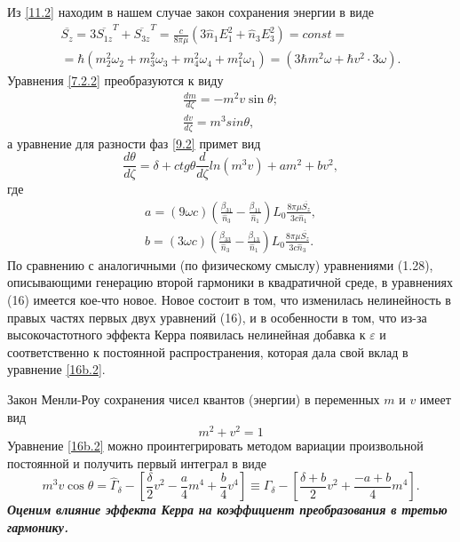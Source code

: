 \documentclass[a4paper]{article}
\begin{document}
	Из \eqref{11.2} находим в нашем случае закон сохранения энергии в виде 
	\begin{multline}
		\overline{S_{z}}=3\overline{S_{1z}}^{T}+\overline{S_{3z}}^{T}=\frac{c}{8\pi\mu}\left(3\hat{n}_{1}E_{1}^{2}+\hat{n}_{3}E_{3}^{2}\right)=const=\\
		=\hbar(m_{2}^{2}\omega_{2}+m_{3}^{2}\omega_{3}+m_{4}^{2}\omega_{4}+m_{1}^{2}\omega_{1})=(3\hbar m^{2}\omega+\hbar v^{2}\cdot3\omega).
		\label{15.2}
	\end{multline}
	Уравнения \eqref{7.2.2} преобразуются к виду
\begin{align}
	\frac{dm}{d\zeta}=-m^{2}v\sin\theta;\label{16a.2}\tag{16a}\\
	\frac{dv}{d\zeta}=m^{3}sin\theta,\label{16b.2}\tag{16б}
\end{align}
а уравнение для разности фаз \eqref{9.2} примет вид
\begin{equation}
	\frac{d\theta}{d\zeta}=\delta+ctg\theta\frac{d}{d\zeta}ln(m^{3}v)+am^{2}+bv^{2},
	\tag{16в}\label{16v.2}
\end{equation}
где \setcounter{equation}{16}
		\begin{equation}
			\begin{aligned}
				a=(9\omega c)\left(\frac{\beta_{31}}{\hat{n}_{3}}-\frac{\beta_{11}}{\hat{n}_{1}}\right)L_{0}\frac{8\pi\mu\overline{S_{z}}}{3c\hat{n}_{1}},\\  
				b=(3\omega c)\left(\frac{\beta_{33}}{\hat{n}_{3}}-\frac{\beta_{13}}{\hat{n}_{1}}\right)L_{0}\frac{8\pi\mu\overline{S_{z}}}{3c\hat{n}_{3}}.
			\end{aligned}
			\label{17.2}
		\end{equation}
		По сравнению с аналогичными (по физическому смыслу) уравнениями (1.28), описывающими генерацию второй гармоники в квадратичной среде, в уравнениях (16) имеется кое-что новое. Новое состоит в том, что изменилась нелинейность в правых частях первых двух уравнений (16), и в особенности в том, что из-за высокочастотного эффекта Керра появилась нелинейная добавка к $\varepsilon$ и соответственно к постоянной распространения, которая дала свой вклад в уравнение \eqref{16b.2}. 
		
		Закон Менли-Роу сохранения чисел квантов (энергии) в переменных $m$ и $v$ имеет вид
		\begin{equation}
			m^{2}+v^{2}=1
			\label{18.2}
		\end{equation}
		Уравнение \eqref{16b.2} можно проинтегрировать методом вариации произвольной постоянной и получить первый интеграл в виде 
		\begin{equation}
			m^{3}v\cos\theta=\hat{\Gamma}_{\delta}-\left[\frac{\delta}{2}v^{2}-\frac{a}{4}m^{4}+\frac{b}{4}v^{4}\right]\equiv\Gamma_{\delta}-\left[\frac{\delta+b}{2}v^{2}+\frac{-a+b}{4}m^{4}\right].
			\label{19.2}
		\end{equation}
		\textbf{\textit{Оценим влияние эффекта Керра на коэффициент преобразования в третью гармонику.}}
	
\end{document}
